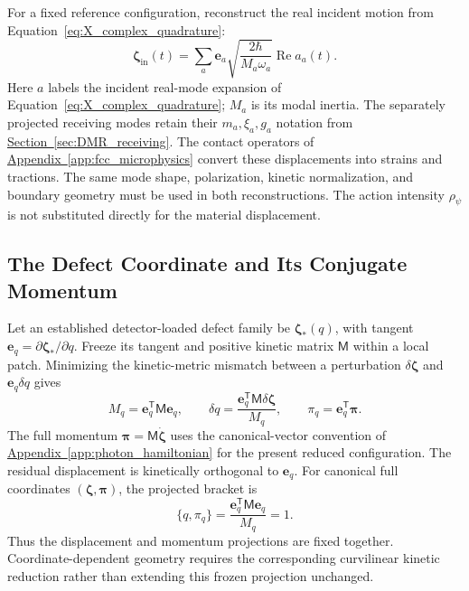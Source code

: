 For a fixed reference configuration, reconstruct the real incident motion from Equation~\eqref{eq:X_complex_quadrature}:
\begin{equation}
 \boldsymbol\zeta_{\mathrm{in}}(t)=
 \sum_a\mathbf e_a
 \sqrt{\frac{2\hbar}{M_a\omega_a}}
 \operatorname{Re}a_a(t).
\label{eq:DMR_field_reconstruction}
\end{equation}
Here $a$ labels the incident real-mode expansion of Equation~\eqref{eq:X_complex_quadrature}; $M_a$ is its modal inertia. The separately projected receiving modes retain their $m_a,\xi_a,g_a$ notation from \hyperref[sec:DMR_receiving]{Section~\ref*{sec:DMR_receiving}}. The contact operators of \hyperref[app:fcc_microphysics]{Appendix~\ref*{app:fcc_microphysics}} convert these displacements into strains and tractions. The same mode shape, polarization, kinetic normalization, and boundary geometry must be used in both reconstructions. The action intensity $\rho_\psi$ is not substituted directly for the material displacement.

\subsection{The Defect Coordinate and Its Conjugate Momentum}

Let an established detector-loaded defect family be $\boldsymbol\zeta_*(q)$, with tangent $\mathbf e_q=\partial\boldsymbol\zeta_*/\partial q$. Freeze its tangent and positive kinetic matrix $\mathsf M$ within a local patch. Minimizing the kinetic-metric mismatch between a perturbation $\delta\boldsymbol\zeta$ and $\mathbf e_q\delta q$ gives
\begin{equation}
 \boxed{
 M_q=\mathbf e_q^{\mathsf T}\mathsf M\mathbf e_q,
 \qquad
 \delta q=\frac{\mathbf e_q^{\mathsf T}\mathsf M\delta\boldsymbol\zeta}{M_q},
 \qquad
 \pi_q=\mathbf e_q^{\mathsf T}\boldsymbol\pi
 }.
\label{eq:DMR_defect_projection}
\end{equation}
The full momentum $\boldsymbol\pi=\mathsf M\dot{\boldsymbol\zeta}$ uses the canonical-vector convention of \hyperref[app:photon_hamiltonian]{Appendix~\ref*{app:photon_hamiltonian}} for the present reduced configuration. The residual displacement is kinetically orthogonal to $\mathbf e_q$. For canonical full coordinates $(\boldsymbol\zeta,\boldsymbol\pi)$, the projected bracket is
\begin{equation}
 \{q,\pi_q\}=\frac{\mathbf e_q^{\mathsf T}\mathsf M\mathbf e_q}{M_q}=1.
\end{equation}
Thus the displacement and momentum projections are fixed together. Coordinate-dependent geometry requires the corresponding curvilinear kinetic reduction rather than extending this frozen projection unchanged.

